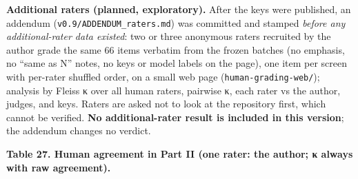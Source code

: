 \documentclass[10pt]{article}
\begin{document}
\textbf{Additional raters (planned, exploratory).} After the keys were published, an addendum (\texttt{v0.\allowbreak{}9/\allowbreak{}ADDENDUM\_\allowbreak{}raters.\allowbreak{}md}) was committed and stamped \emph{before any additional-rater data existed}: two or three anonymous raters recruited by the author grade the same 66 items verbatim from the frozen batches (no emphasis, no ``same as N'' notes, no keys or model labels on the page), one item per screen with per-rater shuffled order, on a small web page (\texttt{human-\allowbreak{}grading-\allowbreak{}web/\allowbreak{}}); analysis by Fleiss κ over all human raters, pairwise κ, each rater vs the author, judges, and keys. Raters are asked not to look at the repository first, which cannot be verified. \textbf{No additional-rater result is included in this version}; the addendum changes no verdict.

\textbf{Table 27. Human agreement in Part II (one rater: the author; κ always with raw agreement).}
\end{document}
